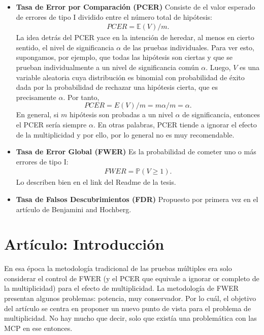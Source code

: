 \documentclass[11pt,letterpaper]{article}
\newcommand{\mP}{\mathbb{P}}
\newcommand{\mE}{\mathbb{E}}
\begin{document}
\begin{itemize}
\item \textbf{Tasa de Error por Comparación (PCER)} Consiste de el valor esperado de errores de tipo I dividido entre el número total de hipótesis:
\begin{align*}
PCER = \mE(V)/m.
\end{align*}
La idea detrás del PCER yace en la intención de heredar, al menos en cierto sentido, el nivel de significancia $\alpha$ de las pruebas individuales. Para ver esto, supongamos, por ejemplo, que todas las hipótesis son ciertas y que se prueban individualmente a un nivel de significancia común $\alpha$.
Luego, $V$ es una variable aleatoria cuya distribución es binomial con probabilidad de éxito dada por la probabilidad de rechazar una hipótesis cierta, que es precisamente $\alpha$. Por tanto, $$PCER =E(V)/m = m\alpha /m = \alpha.$$ En general, si $m$ hipótesis son probadas a un nivel $\alpha$ de significancia, entonces el PCER sería siempre $\alpha$. En otras palabras, PCER tiende a ignorar el efecto de la
multiplicidad y por ello, por lo general no es muy recomendable.

\item \textbf{Tasa de Error Global (FWER)} Es la probabilidad de cometer uno o más errores de tipo I:
\begin{align*}
FWER = \mP(V\geq 1).
\end{align*}
Lo describen bien en el link del Readme de la tesis.

\item \textbf{Tasa de Falsos Descubrimientos (FDR)} 
Propuesto por primera vez en el artículo de Benjamini and Hochberg.
\end{itemize}

\section{Artículo: Introducción}
En esa época la metodología tradicional de las pruebas múltiples era solo considerar el control de FWER (y el PCER que equivale a ignorar or completo de la multiplicidad) para el efecto de multiplicidad. La metodología de FWER presentan algunos problemas: potencia, muy conservador.
Por lo cuál, el objetivo del artículo se centra en proponer un nuevo punto de vista para el problema de multiplicidad. No hay mucho que decir, solo que existía una problemática con las MCP en ese entonces.
\end{document}

